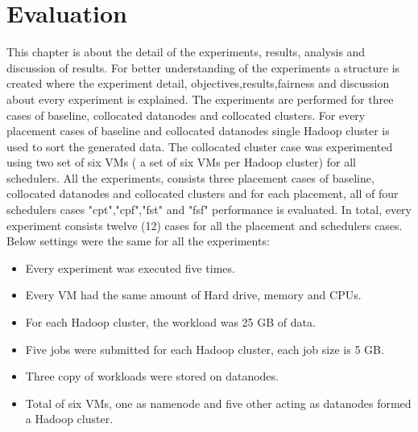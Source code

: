 
\chapter{Evaluation} %

\label{Chapter5} %


This chapter is about the detail of the experiments, results, analysis and discussion of results. For better understanding of the experiments a structure is created where the experiment detail, objectives,results,fairness and discussion about every experiment is explained.  The experiments are performed for three cases of baseline, collocated datanodes and collocated clusters. For every placement cases of baseline and collocated datanodes single Hadoop cluster is used to sort the generated data. The collocated cluster case was experimented using two set of six VMs ( a set of six VMs per Hadoop cluster) for all schedulers. All the experiments, consists three placement cases of baseline, collocated datanodes and collocated clusters and for each placement, all of four schedulers cases "cpt","cpf","fst" and "fsf" performance is evaluated. In total, every experiment consists twelve (12) cases for all the placement and schedulers cases. Below settings were the same for all the experiments:

\begin{itemize}
\item{ Every experiment was executed five times.}
\item{ Every VM had the same amount of Hard drive, memory and CPUs.}
\item{ For each Hadoop cluster, the workload was 25 GB of data.}
\item{ Five jobs were submitted for each Hadoop cluster, each job size is 5 GB.}
\item{ Three copy of workloads were stored on datanodes.}
\item{ Total of six VMs, one as namenode and five other acting as datanodes formed a Hadoop cluster.}

\end{itemize} 

